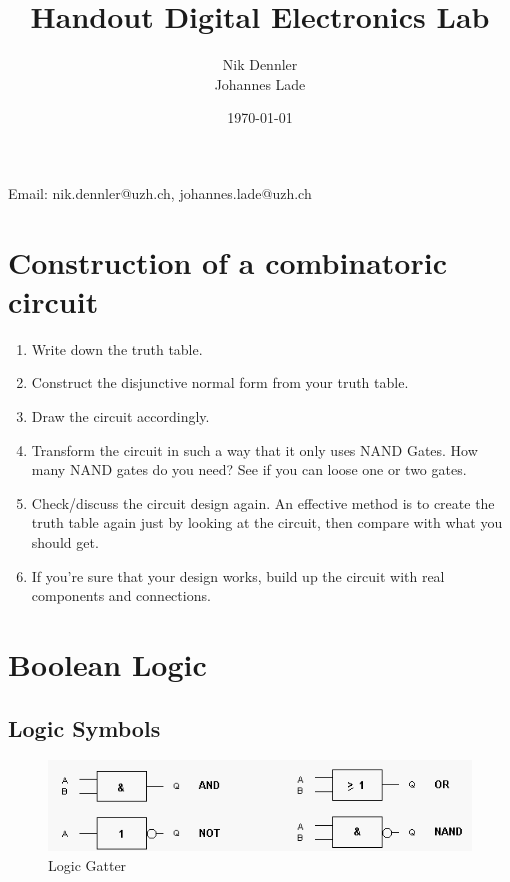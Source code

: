 \documentclass[10pt,a4paper]{article}
\author{Nik Dennler \\ Johannes Lade}
\title{Handout Digital Electronics Lab}
\date{\today{}}
\begin{document}
	
\begin{titlepage}
	\maketitle
		\begin{center}
			Email: nik.dennler@uzh.ch, johannes.lade@uzh.ch
		\end{center}
	\thispagestyle{empty}
\end{titlepage}



\section{Construction of a combinatoric circuit}
\begin{enumerate}
	\item Write down the truth table.
	\item Construct the disjunctive normal form from your truth table.
	\item Draw the circuit accordingly.
	\item Transform the circuit in such a way that it only uses NAND Gates.
	      How many NAND gates do you need? See if you can loose one or two gates.
	\item Check/discuss the circuit design again. An effective method is to create the truth table again just by looking at the circuit, then compare with what you should get. 
	\item If you're sure that your design works, build up the circuit with real components and connections. 
\end{enumerate}

\newpage
\section{Boolean Logic}
\label{sec:exercise-block-1}

\subsection{Logic Symbols}


    \begin{figure}[H]
      \centering
      \includegraphics[width=1\textwidth]{gatter}%
      \caption{Logic Gatter}%
      \label{fig:gatter}
    \end{figure}
    
\end{document}
